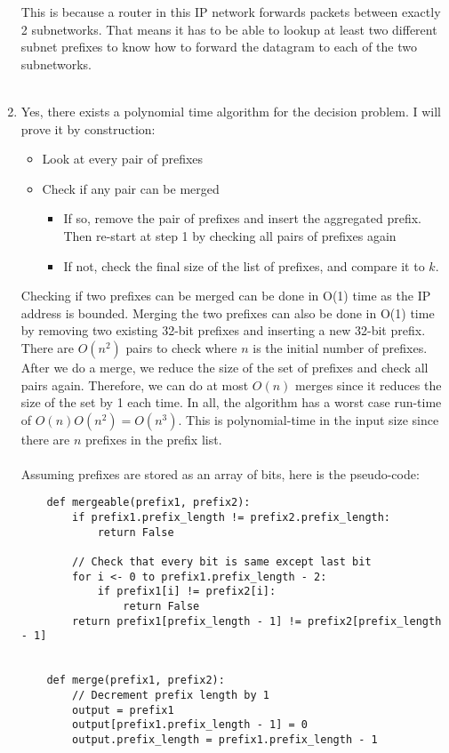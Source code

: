\documentclass[12pt]{article}
\begin{document}
\begin{enumerate}
    This is because a router in this IP network forwards packets between exactly 2 subnetworks. That means it has to be able to lookup at least two different subnet prefixes to know how to forward the datagram to each of the two subnetworks. \\ \\
    \item Yes, there exists a polynomial time algorithm for the decision problem. I will prove it by construction:
    \begin{itemize}
    \item Look at every pair of prefixes
    \item Check if any pair can be merged
    \begin{itemize}
    	\item If so, remove the pair of prefixes and insert the aggregated prefix. Then re-start at step 1 by checking all pairs of prefixes again
    	\item If not, check the final size of the list of prefixes, and compare it to $k$.
    \end{itemize}
    \end{itemize}
    Checking if two prefixes can be merged can be done in O(1) time as the IP address is bounded. Merging the two prefixes can also be done in O(1) time by removing two existing 32-bit prefixes and inserting a new 32-bit prefix. There are $O(n^2)$ pairs to check where $n$ is the initial number of prefixes. After we do a merge, we reduce the size of the set of prefixes and check all pairs again. Therefore, we can do at most $O(n)$ merges since it reduces the size of the set by 1 each time. In all, the algorithm has a worst case run-time of $O(n)O(n^2) = O(n^3)$. This is polynomial-time in the input size since there are $n$ prefixes in the prefix list. \\ \\ Assuming prefixes are stored as an array of bits, here is the pseudo-code: 
    \begin{verbatim}
    def mergeable(prefix1, prefix2):
        if prefix1.prefix_length != prefix2.prefix_length:
            return False
            
        // Check that every bit is same except last bit
        for i <- 0 to prefix1.prefix_length - 2:
            if prefix1[i] != prefix2[i]:
                return False
        return prefix1[prefix_length - 1] != prefix2[prefix_length - 1]

    
    def merge(prefix1, prefix2):
        // Decrement prefix length by 1
        output = prefix1
        output[prefix1.prefix_length - 1] = 0
        output.prefix_length = prefix1.prefix_length - 1    
    

\end{verbatim}
\end{enumerate}
\end{document}
